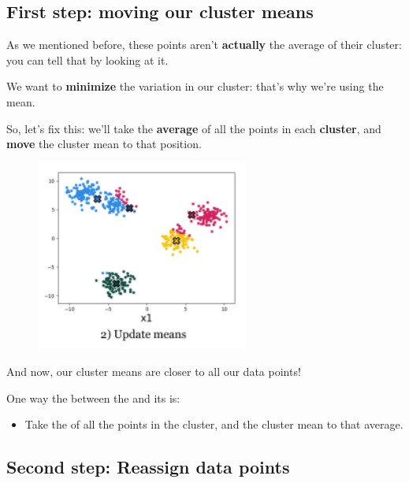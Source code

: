     \subsection*{First step: moving our cluster means}
    
        As we mentioned before, these points aren't \textbf{actually} the average of their cluster: you can tell that by looking at it.
        
        We want to \textbf{minimize} the variation in our cluster: that's why we're using the mean.
        
        So, let's fix this: we'll take the \textbf{average} of all the points in each \textbf{cluster}, and \textbf{move} the cluster mean to that position.
        
        \begin{figure}[H]
            \centering
            \includegraphics[width=70mm,scale=0.4]{images/clustering_images/update_means_clustering.png}
        \end{figure}
        
        And now, our cluster means are closer to all our data points!\\
        
        \begin{concept}
            One way  the  between the  and its  is:
            
            \begin{itemize}
                \item Take the  of all the points in the cluster, and  the cluster mean to that average.
            \end{itemize} 
        \end{concept}
        
    \subsection*{Second step: Reassign data points}
    
